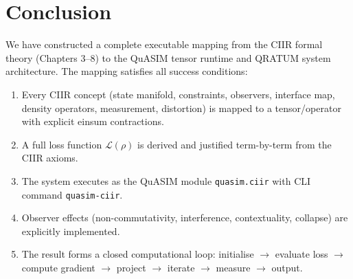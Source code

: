\documentclass[11pt,a4paper]{article}
\newcommand{\CL}{\mathcal{L}}
\begin{document}
\section{Conclusion}
\label{sec:conclusion}

We have constructed a complete executable mapping from the CIIR formal
theory (Chapters 3--8) to the QuASIM tensor runtime and QRATUM system
architecture.  The mapping satisfies all success conditions:

\begin{enumerate}
  \item Every CIIR concept (state manifold, constraints, observers,
    interface map, density operators, measurement, distortion) is
    mapped to a tensor/operator with explicit einsum contractions.

  \item A full loss function $\CL(\rho)$ is derived and justified
    term-by-term from the CIIR axioms.

  \item The system executes as the QuASIM module
    \texttt{quasim.ciir} with CLI command \texttt{quasim-ciir}.

  \item Observer effects (non-commutativity, interference,
    contextuality, collapse) are explicitly implemented.

  \item The result forms a closed computational loop:
    initialise $\to$ evaluate loss $\to$ compute gradient $\to$
    project $\to$ iterate $\to$ measure $\to$ output.
\end{enumerate}
\end{document}

